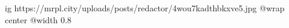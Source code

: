  
 
 
 
 

\ifcmt
  ig https://mrpl.city/uploads/posts/redactor/4wou7kadthbkxve5.jpg
  @wrap center
  @width 0.8
\fi
